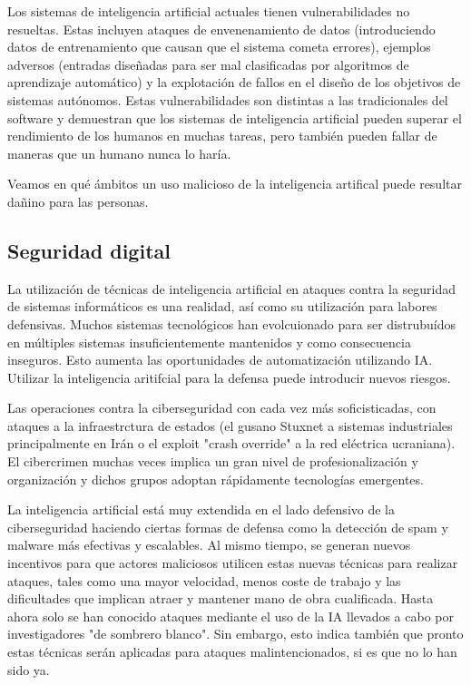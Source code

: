 \documentclass[12pt,a4paper]{article}
\begin{document}
Los sistemas de inteligencia artificial actuales tienen vulnerabilidades no resueltas. Estas incluyen ataques de envenenamiento de datos (introduciendo datos de entrenamiento que causan que el sistema cometa errores), ejemplos adversos (entradas diseñadas para ser mal clasificadas por algoritmos de aprendizaje automático) y la explotación de fallos en el diseño de los objetivos de sistemas autónomos. Estas vulnerabilidades son distintas a las tradicionales del software y demuestran que los sistemas de inteligencia artificial pueden superar el rendimiento de los humanos en muchas tareas, pero también pueden fallar de maneras que un humano nunca lo haría.

Veamos en qué ámbitos un uso malicioso de la inteligencia artifical puede resultar dañino para las personas.

\subsection{Seguridad digital}

La utilización de técnicas de inteligencia artificial en ataques contra la seguridad de sistemas informáticos es una realidad, así como su utilización para labores defensivas. Muchos sistemas tecnológicos han evolcuionado para ser distrubuídos en múltiples sistemas insuficientemente mantenidos y como consecuencia inseguros. Esto aumenta las oportunidades de automatización utilizando IA. Utilizar la inteligencia aritifcial para la defensa puede introducir nuevos riesgos.

Las operaciones contra la ciberseguridad con cada vez más soficisticadas, con ataques a la infraestrctura de estados (el gusano Stuxnet a sistemas industriales principalmente en Irán o el exploit "crash override" a la red eléctrica ucraniana). El cibercrimen muchas veces implica un gran nivel de profesionalización y organización y dichos grupos adoptan rápidamente tecnologías emergentes.

La inteligencia artificial está muy extendida en el lado defensivo de la ciberseguridad haciendo ciertas formas de defensa como la detección de spam y malware más efectivas y escalables. Al mismo tiempo, se generan nuevos incentivos para que actores maliciosos utilicen estas nuevas técnicas para realizar ataques, tales como una mayor velocidad, menos coste de trabajo y las dificultades que implican atraer y mantener mano de obra cualificada. Hasta ahora solo se han conocido ataques mediante el uso de la IA llevados a cabo por investigadores "de sombrero blanco". Sin embargo, esto indica también que pronto estas técnicas serán aplicadas para ataques malintencionados, si es que no lo han sido ya.
\end{document}
